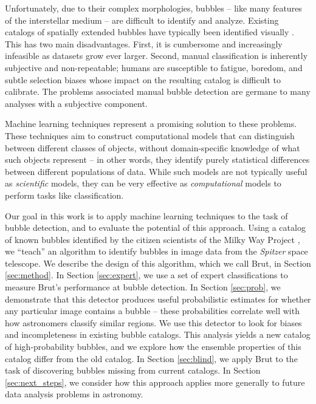 Unfortunately, due to their complex morphologies, bubbles -- like many features of the interstellar medium -- are difficult to identify and analyze. Existing catalogs of spatially extended bubbles have typically been identified visually \citep{Churchwell06, Churchwell07, Simpson12, Helfand06}. This has two main disadvantages. First, it is cumbersome and increasingly infeasible as datasets grow ever larger. Second, manual classification is inherently subjective and non-repeatable; humans are susceptible to fatigue, boredom, and subtle selection biases whose impact on the resulting catalog is difficult to calibrate. The problems associated manual bubble detection are germane to many analyses with a subjective component.

Machine learning techniques represent a promising solution to these problems. These techniques aim to construct computational models that can distinguish between different classes of objects, without domain-specific knowledge of what such objects represent -- in other words, they identify purely statistical differences between different populations of data. While such models are not typically useful as \textit{scientific} models, they can be very effective as \textit{computational} models to perform tasks like classification.

Our goal in this work is to apply machine learning techniques to the task of bubble detection, and to evaluate the potential of this approach. Using a catalog of known bubbles identified by the citizen scientists of the Milky Way Project \citep{Simpson12}, we ``teach'' an algorithm to identify bubbles in image data from the \textit{Spitzer} space telescope. We describe the design of this algorithm, which we call Brut, in Section \ref{sec:method}. In Section \ref{sec:expert}, we use a set of expert classifications to measure Brut's performance at bubble detection. In Section \ref{sec:prob}, we demonstrate that this detector produces useful probabilistic estimates for whether any particular image contains a bubble -- these probabilities correlate well with how astronomers classify similar regions. We use this detector to look for biases and incompleteness in existing bubble catalogs. This analysis yields a new catalog of high-probability bubbles, and we explore how the ensemble properties of this catalog differ from the old catalog. In Section \ref{sec:blind}, we apply Brut to the task of discovering bubbles missing from current catalogs. In Section \ref{sec:next_steps}, we consider how this approach applies more generally to future data analysis problems in astronomy.

